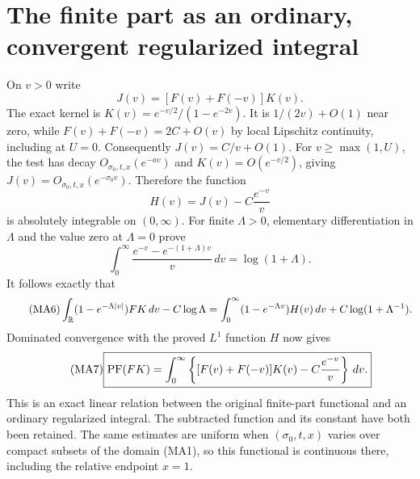 \documentclass[11pt,a4paper]{article}
\providecommand{\dd}{\,d}
\begin{document}
\section{The finite part as an ordinary, convergent regularized integral}
On $v>0$ write
\[
 J(v)=[F(v)+F(-v)]K(v).
\]
The exact kernel is $K(v)=e^{-v/2}/(1-e^{-2v})$.
It is $1/(2v)+O(1)$ near zero, while
$F(v)+F(-v)=2C+O(v)$ by local Lipschitz continuity, including at $U=0$.
Consequently $J(v)=C/v+O(1)$. For $v\ge\max(1,U)$, the test has decay
$O_{\sigma_0,t,x}(e^{-av})$ and $K(v)=O(e^{-v/2})$, giving
$J(v)=O_{\sigma_0,t,x}(e^{-\sigma_0v})$.
Therefore the function
\begin{equation}\tag{MA5}
 H(v)=J(v)-C\frac{e^{-v}}v
\end{equation}
is absolutely integrable on $(0,\infty)$.
For finite $\Lambda>0$, elementary differentiation in $\Lambda$ and the
value zero at $\Lambda=0$ prove
\[
 \int_0^\infty\frac{e^{-v}-e^{-(1+\Lambda)v}}v\dd v=\log(1+\Lambda).
\]
It follows exactly that
\begin{equation}\tag{MA6}
 \int_\R(1-e^{-\Lambda|v|})FK\dd v-C\log\Lambda
 =\int_0^\infty(1-e^{-\Lambda v})H(v)\dd v
  +C\log(1+\Lambda^{-1}).
\end{equation}
Dominated convergence with the proved $L^1$ function $H$ now gives
\begin{equation}\tag{MA7}
 \boxed{\PF(FK)=\int_0^\infty
 \left\{[F(v)+F(-v)]K(v)-C\frac{e^{-v}}v\right\}\dd v.}
\end{equation}
This is an exact linear relation between the original finite-part functional
and an ordinary regularized integral. The subtracted function and its
constant have both been retained. The same estimates are uniform when
$(\sigma_0,t,x)$ varies over compact subsets of the domain (MA1), so this
functional is continuous there, including the relative endpoint $x=1$.
\end{document}
